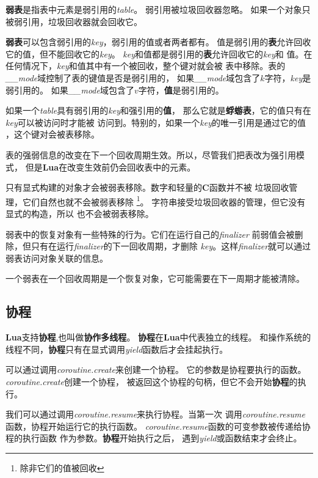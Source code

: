 \documentclass{ctexart}
\begin{document}
\textbf{弱表}是指表中元素是弱引用的\emph{table}。
弱引用被垃圾回收器忽略。
如果一个对象只被弱引用，垃圾回收器就会回收它。

\textbf{弱表}可以包含弱引用的\emph{key}，弱引用的值或者两者都有。
值是弱引用的\textbf{表}允许回收它的值，但不能回收它的\emph{key}。
\emph{key}和值都是弱引用的\textbf{表}允许回收它的\emph{key}和
值。在任何情况下，\emph{key}和值其中有一个被回收，整个键对就会被
表中移除。表的\emph{\_\_mode}域控制了表的键值是否是弱引用的，
如果\emph{\_\_mode}域包含了$k$字符，\emph{key}是弱引用的。
如果\emph{\_\_mode}域包含了$v$字符，\textbf{值}是弱引用的。

如果一个\emph{table}具有弱引用的\emph{key}和强引用的\textbf{值}，
那么它就是\textbf{蜉蝣表}，它的值只有在\emph{key}可以被访问时才能被
访问到。特别的，如果一个\emph{key}的唯一引用是通过它的值
，这个键对会被表移除。

表的强弱信息的改变在下一个回收周期生效。所以，尽管我们把表改为强引用模式，
但是\textbf{Lua}在改变生效前仍会回收表中的元素。

只有显式构建的对象才会被弱表移除。数字和轻量的\textbf{C}函数并不被
垃圾回收管理，它们自然也就不会被弱表移除
\footnote{除非它们的值被回收}。
字符串接受垃圾回收器的管理，但它没有显式的构造，所以
也不会被弱表移除。

弱表中的恢复对象有一些特殊的行为。它们在运行自己的\emph{finalizer}
前弱值会被删除，但只有在运行\emph{finalizer}的下一回收周期，才删除
\emph{key}。这样\emph{finalizer}就可以通过弱表访问对象关联的信息。

一个弱表在一个回收周期是一个恢复对象，它可能需要在下一周期才能被清除。

\subsection{协程}

\textbf{Lua}支持\textbf{协程},也叫做\textbf{协作多线程}。
\textbf{协程}在\textbf{Lua}中代表独立的线程。
和操作系统的线程不同，\textbf{协程}只有在显式调用\emph{yield}函数后才会挂起执行。

可以通过调用\emph{coroutine.create}来创建一个协程。
它的参数是协程要执行的函数。\emph{coroutine.create}创建一个协程，
被返回这个协程的句柄，但它不会\textbf{}开始\textbf{协程}的执行。

我们可以通过调用\emph{coroutine.resume}来执行协程。当第一次
调用\emph{coroutine.resume}函数，协程开始运行它的执行函数。
\emph{coroutine.resume}函数的可变参数被传递给协程的执行函数
作为参数。\textbf{协程}开始执行之后，
遇到\emph{yield}或函数结束才会终止。
\end{document}
